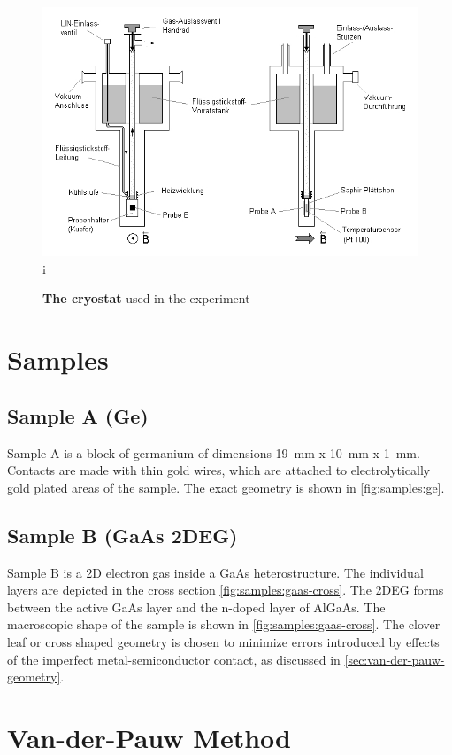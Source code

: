 \begin{figure}
	\centering
	\includegraphics[width=.7\textwidth]{./img/cryostat.png}i
	\caption[Cryostat]{\textbf{The cryostat} used in the experiment}
	\label{fig:cryostat}
\end{figure}

\section{Samples}
\subsection{Sample A (Ge)}
Sample A is a block of germanium of dimensions \SI{19}{\mm} x \SI{10}{\mm} x \SI{1}{\mm}.
Contacts are made with thin gold wires, which are attached to electrolytically gold plated areas of the sample.
The exact geometry is shown in \autoref{fig:samples:ge}.

\subsection{Sample B (GaAs 2DEG)}
Sample B is a 2D electron gas inside a GaAs heterostructure.
The individual layers are depicted in the cross section \autoref{fig:samples:gaas-cross}.
The 2DEG forms between the active GaAs layer and the n-doped layer of AlGaAs.
The macroscopic shape of the sample is shown in \autoref{fig:samples:gaas-cross}.
The clover leaf or cross shaped geometry is chosen to minimize errors introduced by effects of the imperfect metal-semiconductor contact, as discussed in \autoref{sec:van-der-pauw-geometry}.

\section{Van-der-Pauw Method}\label{sec:van-der-pauw-geometry}
